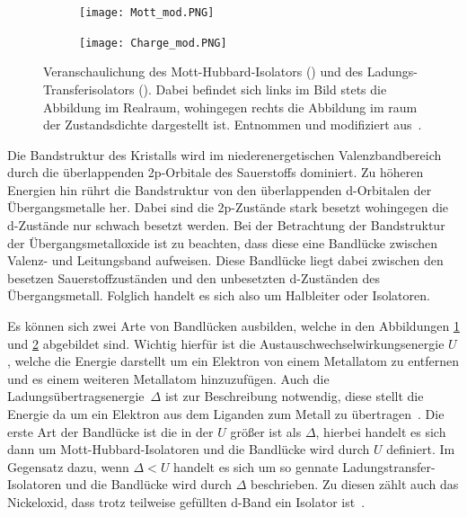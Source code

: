        \begin{figure}
            \centering
            \begin{subfigure}{0.48\textwidth}
                \centering
                \texttt{[image: Mott\_mod.PNG]}
                \subcaption{}
                \label{fig:Mott}
            \end{subfigure}
            \begin{subfigure}{0.48\textwidth}
                \centering
                \texttt{[image: Charge\_mod.PNG]}
                \subcaption{}
                \label{fig:Charge}
            \end{subfigure}
            \label{fig:Bandl}
            \caption{Veranschaulichung des Mott-Hubbard-Isolators () und des Ladungs-Transferisolators ().
            Dabei befindet sich links im Bild stets die Abbildung im Realraum, wohingegen rechts die Abbildung im raum der Zustandsdichte dargestellt ist.
            Entnommen und modifiziert aus~\cite{stohr_magnetism_2006}.}
        \end{figure}
        Die Bandstruktur des Kristalls wird im niederenergetischen Valenzbandbereich durch die überlappenden 2p-Orbitale des Sauerstoffs dominiert.
        Zu höheren Energien hin rührt die Bandstruktur von den überlappenden d-Orbitalen der Übergangsmetalle her.
        Dabei sind die 2p-Zustände stark besetzt wohingegen die d-Zustände nur schwach besetzt werden.
        Bei der Betrachtung der Bandstruktur der Übergangsmetalloxide ist zu beachten, dass diese eine Bandlücke zwischen Valenz- und Leitungsband aufweisen.
        Diese Bandlücke liegt dabei zwischen den besetzen Sauerstoffzuständen und den unbesetzten d-Zuständen des Übergangsmetall.
        Folglich handelt es sich also um Halbleiter oder Isolatoren.

        Es können sich zwei Arte von Bandlücken ausbilden, welche in den Abbildungen \ref{fig:Mott} und \ref{fig:Charge} abgebildet sind.
        Wichtig hierfür ist die Austauschwechselwirkungsenergie $U$, welche die Energie darstellt um ein Elektron von einem Metallatom zu entfernen und es einem weiteren Metallatom hinzuzufügen.
        Auch die Ladungsübertragsenergie~$\Delta$ ist zur Beschreibung notwendig, diese stellt die Energie da um ein Elektron aus dem Liganden zum Metall zu übertragen~\cite{stohr_magnetism_2006}.
        Die erste Art der Bandlücke ist die in der $U$ größer ist als $\Delta$, hierbei handelt es sich dann um Mott-Hubbard-Isolatoren und die Bandlücke wird durch $U$ definiert.
        Im Gegensatz dazu, wenn $\Delta < U$ handelt es sich um so gennate Ladungstransfer-Isolatoren und die Bandlücke wird durch $\Delta$ beschrieben.
        Zu diesen zählt auch das Nickeloxid, dass trotz teilweise gefüllten d-Band ein Isolator ist~\cite{IF_5}.

